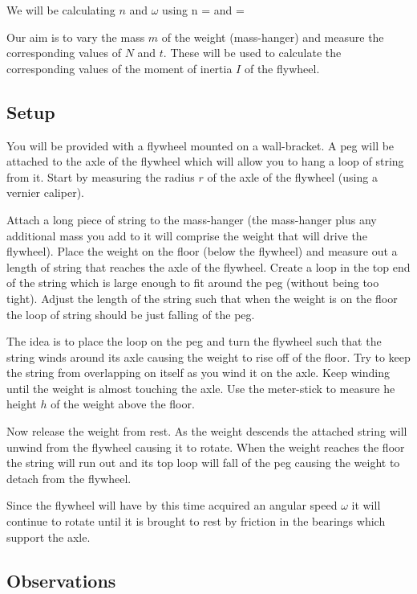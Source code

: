     \eline
    We will be calculating $n$ and $\omega$ using
    \beq \label{n}
        n = 
    \eeq
    and
    \beq \label{omega}
        \omega = 
    \eeq

    Our aim is to vary the mass $m$ of the weight (mass-hanger) and measure the corresponding values of $N$ and $t$. These will be used to calculate the corresponding values of the moment of inertia $I$ of the flywheel.

    \subsection{Setup}

        You will be provided with a flywheel mounted on a wall-bracket. A peg will be attached to the axle of the flywheel which will allow you to hang a loop of string from it. Start by measuring the radius $r$ of the axle of the flywheel (using a vernier caliper).

        Attach a long piece of string to the mass-hanger (the mass-hanger plus any additional mass you add to it will comprise the weight that will drive the flywheel). Place the weight on the floor (below the flywheel) and measure out a length of string that reaches the axle of the flywheel. Create a loop in the top end of the string which is large enough to fit around the peg (without being too tight). Adjust the length of the string such that when the weight is on the floor the loop of string should be just falling of the peg.

        The idea is to place the loop on the peg and turn the flywheel such that the string winds around its axle causing the weight to rise off of the floor. Try to keep the string from overlapping on itself as you wind it on the axle. Keep winding until the weight is almost touching the axle. Use the meter-stick to measure he height $h$ of the weight above the floor.

        Now release the weight from rest. As the weight descends the attached string will unwind from the flywheel causing it to rotate. When the weight reaches the floor the string will run out and its top loop will fall of the peg causing the weight to detach from the flywheel.

        Since the flywheel will have by this time acquired an angular speed $\omega$ it will continue to rotate until it is brought to rest by friction in the bearings which support the axle.

    \subsection{Observations}

